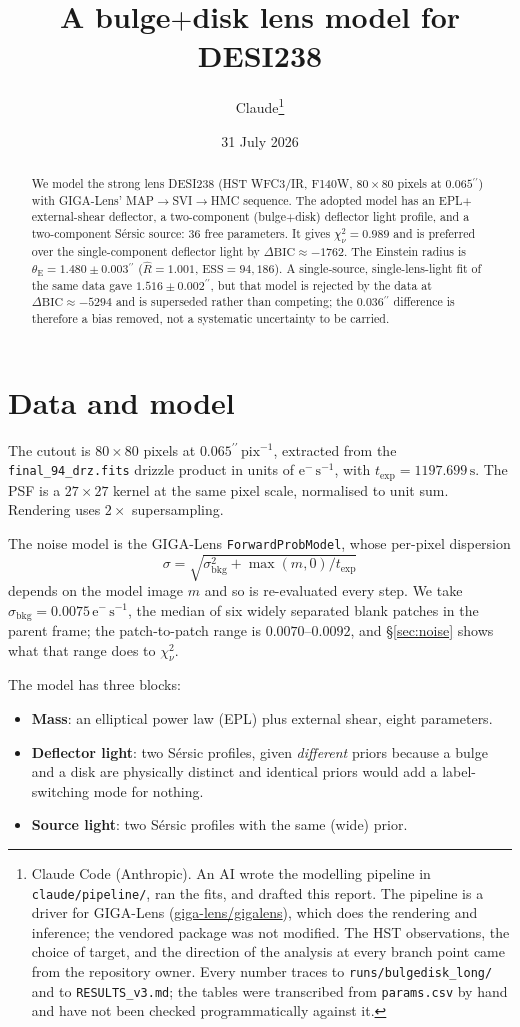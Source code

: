 \documentclass[11pt]{article}
\title{A bulge$+$disk lens model for DESI238}
\author{Claude\thanks{Claude Code (Anthropic). An AI wrote the modelling pipeline in
\texttt{claude/pipeline/}, ran the fits, and drafted this report. The pipeline is a
driver for GIGA-Lens (\href{https://github.com/giga-lens/gigalens}{giga-lens/gigalens}),
which does the rendering and inference; the vendored package was not modified. The HST
observations, the choice of target, and the direction of the analysis at every branch
point came from the repository owner. Every number traces to
\texttt{runs/bulgedisk\_long/} and to \texttt{RESULTS\_v3.md}; the tables were transcribed
from \texttt{params.csv} by hand and have not been checked programmatically against it.}}
\date{31 July 2026}
\newcommand{\arcsec}{\ensuremath{^{\prime\prime}}}
\newcommand{\thetaE}{\ensuremath{\theta_{\mathrm{E}}}}
\newcommand{\chisqv}{\ensuremath{\chi^{2}_{\nu}}}
\begin{document}
\maketitle

\begin{abstract}
We model the strong lens DESI238 (HST WFC3/IR, F140W, $80\times80$ pixels at
$0.065\arcsec$) with GIGA-Lens' MAP$\rightarrow$SVI$\rightarrow$HMC sequence. The adopted
model has an EPL$+$external-shear deflector, a two-component (bulge$+$disk) deflector
light profile, and a two-component S\'ersic source: 36 free parameters. It gives
$\chisqv = 0.989$ and is preferred over the single-component deflector light by
$\Delta\mathrm{BIC} \approx -1762$. The Einstein radius is
$\thetaE = 1.480 \pm 0.003\arcsec$ (\mbox{$\hat{R} = 1.001$}, $\mathrm{ESS} = 94{,}186$).
A single-source, single-lens-light fit of the same data gave $1.516 \pm 0.002\arcsec$, but
that model is rejected by the data at $\Delta\mathrm{BIC} \approx -5294$ and is superseded
rather than competing; the $0.036\arcsec$ difference is therefore a bias removed, not a
systematic uncertainty to be carried.
\end{abstract}

\section{Data and model}

The cutout is $80\times80$ pixels at $0.065\arcsec\,\mathrm{pix}^{-1}$, extracted from the
\texttt{final\_94\_drz.fits} drizzle product in units of $\mathrm{e^{-}\,s^{-1}}$, with
$t_{\mathrm{exp}} = 1197.699\,\mathrm{s}$. The PSF is a $27\times27$ kernel at the same
pixel scale, normalised to unit sum. Rendering uses $2\times$ supersampling.

The noise model is the GIGA-Lens \texttt{ForwardProbModel}, whose per-pixel dispersion
%
\begin{equation}
  \sigma = \sqrt{\sigma_{\mathrm{bkg}}^{2} + \max(m,0)/t_{\mathrm{exp}}}
\end{equation}
%
depends on the model image $m$ and so is re-evaluated every step. We take
$\sigma_{\mathrm{bkg}} = 0.0075\,\mathrm{e^{-}\,s^{-1}}$, the median of six widely
separated blank patches in the parent frame; the patch-to-patch range is
$0.0070$--$0.0092$, and \S\ref{sec:noise} shows what that range does to \chisqv.

The model has three blocks:

\begin{itemize}
  \item \textbf{Mass}: an elliptical power law (EPL) plus external shear, eight
    parameters.
  \item \textbf{Deflector light}: two S\'ersic profiles, given \emph{different} priors
    because a bulge and a disk are physically distinct and identical priors would add a
    label-switching mode for nothing.
  \item \textbf{Source light}: two S\'ersic profiles with the same (wide) prior.
\end{itemize}
\end{document}
